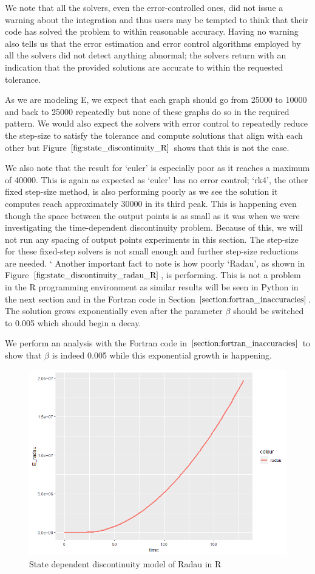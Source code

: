 We note that all the solvers, even the error-controlled ones, did not issue a warning about the integration and thus users may be tempted to think that their code has solved the problem to within reasonable accuracy. Having no warning also tells us that the error estimation and error control algorithms employed by all the solvers did not detect anything abnormal; the solvers return with an indication that the provided solutions are accurate to within the requested tolerance.

As we are modeling E, we expect that each graph should go from 25000 to 10000 and back to 25000 repeatedly but none of these graphs do so in the required pattern. We would also expect the solvers with error control to repeatedly reduce the step-size to satisfy the tolerance and compute solutions that align with each other but Figure $\ref{fig:state_discontinuity_R}$ shows that this is not the case.

We also note that the result for `euler' is especially poor as it reaches a maximum of 40000. This is again as expected as `euler' has no error control; `rk4', the other fixed step-size method, is also performing poorly as we see the solution it computes reach approximately 30000 in its third peak. This is happening even though the space between the output points is as small as it was when we were investigating the time-dependent discontinuity problem. Because of this, we will not run any spacing of output points experiments in this section. The step-size for these fixed-step solvers is not small enough and further step-size reductions are needed.
`
Another important fact to note is how poorly `Radau', as shown in Figure $\ref{fig:state_discontinuity_radau_R}$, is performing. This is not a problem in the R programming environment as similar results will be seen in Python in the next section and in the Fortran code in Section $\ref{section:fortran_inaccuracies}$. The solution grows exponentially even after the parameter $\beta$ should be switched to 0.005 which should begin a decay.

We perform an analysis with the Fortran code in $\ref{section:fortran_inaccuracies}$ to show that $\beta$ is indeed 0.005 while this exponential growth is happening. 

\begin{figure}[h]
\centering
\includegraphics[width=0.7\linewidth]{./figures/state_discontinuity_radau_R}
\caption{State dependent discontinuity model of Radau in R}
\label{fig:state_discontinuity_radau_R}
\end{figure}


